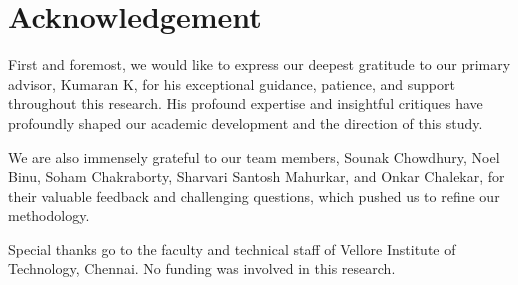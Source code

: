 \section*{Acknowledgement}

First and foremost, we would like to express our deepest gratitude to our primary advisor, Kumaran K, for his exceptional guidance, patience, and support throughout this research. His profound expertise and insightful critiques have profoundly shaped our academic development and the direction of this study.

We are also immensely grateful to our team members, Sounak Chowdhury, Noel Binu, Soham Chakraborty, Sharvari Santosh Mahurkar, and Onkar Chalekar, for their valuable feedback and challenging questions, which pushed us to refine our methodology.

Special thanks go to the faculty and technical staff of Vellore Institute of Technology, Chennai. No funding was involved in this research.
